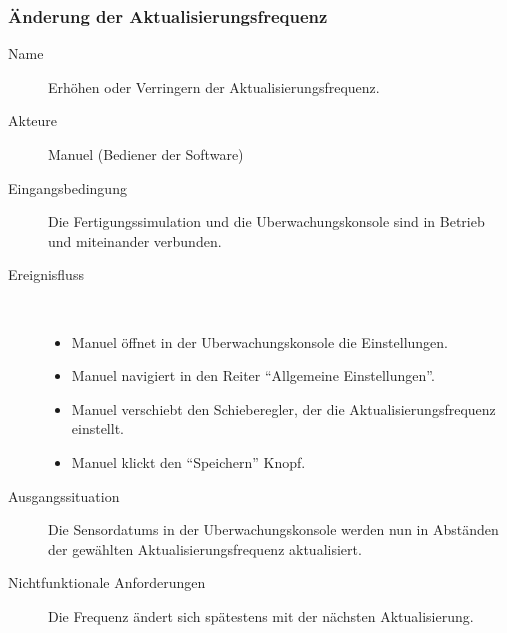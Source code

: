 \documentclass[parskip=full]{scrartcl}
\begin{document}
\subsubsection{Änderung der Aktualisierungsfrequenz}
\begin{description}
  \item[Name] Erhöhen oder Verringern der Aktualisierungsfrequenz.
  \item[Akteure] Manuel (Bediener der Software)
  \item[Eingangsbedingung] Die \gls{Fertigungssimulation} und die \gls{Uberwachungskonsole} sind in Betrieb und miteinander verbunden.
  \item[Ereignisfluss]~\\
  \begin{itemize}[noitemsep]
    \item Manuel öffnet in der \gls{Uberwachungskonsole} die Einstellungen.
    \item Manuel navigiert in den Reiter "`Allgemeine Einstellungen"'.
    \item Manuel verschiebt den Schieberegler, der die Aktualisierungsfrequenz einstellt.
    \item Manuel klickt den "`Speichern"' Knopf.
  \end{itemize}
  \item[Ausgangssituation] Die \glspl{Sensordatum} in der \gls{Uberwachungskonsole} werden nun in Abständen der gewählten Aktualisierungsfrequenz aktualisiert.
  \item [Nichtfunktionale Anforderungen] Die Frequenz ändert sich spätestens mit der nächsten Aktualisierung.
\end{description}
\end{document}
